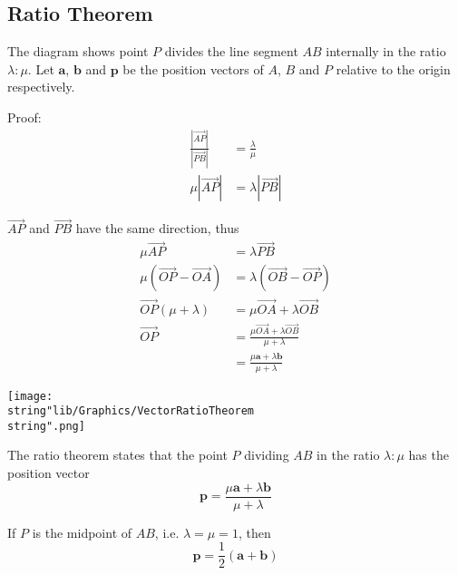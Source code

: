 \documentclass[11pt,a4paper]{book}
\begin{document}
\subsection{Ratio Theorem }

The diagram shows point $P$ divides the line segment $AB$ internally
in the ratio $\lambda:\mu$. Let $\textbf{a}$, $\textbf{b}$ and
$\textbf{p}$ be the position vectors of $A$, $B$ and $P$ relative
to the origin respectively.

\begin{minipage}[t]{0.5\textwidth}

\begin{fleqn}

Proof:
\begin{align*}
\frac{\left|\overrightarrow{AP}\right|}{\left|\overrightarrow{PB}\right|} & =\frac{\lambda}{\mu}\\
\mu\left|\overrightarrow{AP}\right| & =\lambda\left|\overrightarrow{PB}\right|
\end{align*}

$\overrightarrow{AP}$ and $\overrightarrow{PB}$ have the same direction,
thus
\begin{align*}
\mu\overrightarrow{AP} & =\lambda\overrightarrow{PB}\\
\mu\left(\overrightarrow{OP}-\overrightarrow{OA}\right) & =\lambda\left(\overrightarrow{OB}-\overrightarrow{OP}\right)\\
\overrightarrow{OP}\left(\mu+\lambda\right) & =\mu\overrightarrow{OA}+\lambda\overrightarrow{OB}\\
\overrightarrow{OP} & =\frac{\mu\overrightarrow{OA}+\lambda\overrightarrow{OB}}{\mu+\lambda}\\
 & =\frac{\mu\textbf{a}+\lambda\textbf{b}}{\mu+\lambda}
\end{align*}

\end{fleqn}

\end{minipage}
\begin{minipage}[t]{0.1\textwidth}
\begin{center}
\texttt{[image: \\string"lib/Graphics/VectorRatioTheorem\\string".png]}
\par\end{center}

\end{minipage}

\begin{tcolorbox}[colback=blue!5, colframe=black, boxrule=.4pt, sharpish corners]

The ratio theorem states that the point $P$ dividing $AB$ in the
ratio $\lambda:\mu$ has the position vector
\[
\textbf{p}=\frac{\mu\textbf{a}+\lambda\textbf{b}}{\mu+\lambda}
\]

If $P$ is the midpoint of $AB$, i.e. $\lambda=\mu=1$, then
\[
\textbf{p}=\frac{1}{2}\left(\textbf{a}+\textbf{b}\right)
\]
\end{tcolorbox}
\end{document}
